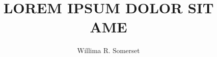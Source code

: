 \newcommand{\monog}{%
  \uppercase{
	Lorem ipsum dolor sit ame
  }
}

\title{\monog}

\newcommand{\por}{%
  Willima R. Somerset
}
\author{\por}

\newcommand{\subtitulo}{}

\newcommand{\univ}
{
  \hspace{0.1cm}Pontifícia \hspace{0.1cm}Universidade\hspace{0.1cm} Católica \hspace{0.1cm}de\hspace{0.2cm} Minas\hspace{0.2cm} Gerais
}

\newcommand{\curso}
{
  \hspace{0.1cm} Programa \hspace{0.1cm} de \hspace{0.1cm} Pós-graduação\hspace{0.1cm} em \hspace{0.1cm} Engenharia Mecânica
}

\newcommand{\grau}{Mestre em  Engenharia Mecânica}
\newcommand{\tipo}{Dissertação}

\newcommand{\profOrientador}{ Prof. Dr. Dante Alighieri }
\newcommand{\ProfOrientadorInstituicao}{ Scuola poetica Siciliana}
\newcommand{\ProfOrientadorStatus}{ Orientador}

\newcommand{\profA}{ Prof. Dr. Thomas Aquinas }
\newcommand{\ProfAInstituicao}{ University of Paris }
\newcommand{\ProfAStatus}{ Banca Examinadora}

\newcommand{\profB}{Prof. Dr. Geoffrey Chaucer }
\newcommand{\ProfBInstituicao}{ Inner Temple }
\newcommand{\ProfBStatus}{Banca Examinadora}

\newcommand{\areaConcentracao}{Estruturas e Dinâmica}

\newcommand{\cidade}{Belo Horizonte}

\newcommand{\ano}{\the\year}

\newcommand{\dataCompleta}{05 de Julho de \the\year}

